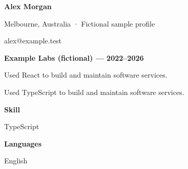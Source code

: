 \documentclass[10pt,a4paper]{article}
\begin{document}
{\LARGE\bfseries\color{navy} Alex Morgan}\par
Melbourne, Australia · Fictional sample profile\par
alex@example.test\par
{\large\bfseries\color{navy} Example Labs (fictional) — 2022–2026}\par
Used React to build and maintain software services.\par
Used TypeScript to build and maintain software services.\par
{\large\bfseries\color{navy} Skill}\par
TypeScript\par
{\large\bfseries\color{navy} Languages}\par
English\par
\end{document}
